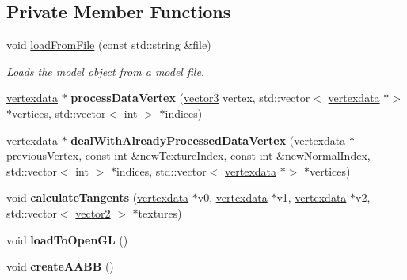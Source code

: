 \subsection*{Private Member Functions}
\begin{DoxyCompactItemize}
\item 
void \hyperlink{classflounder_1_1model_a34c636bee22fcf36fa2a2fcfe0bdadb3}{load\+From\+File} (const std\+::string \&file)
\begin{DoxyCompactList}\small\item\em Loads the model object from a model file. \end{DoxyCompactList}\item 
\mbox{\label{classflounder_1_1model_a24e81bf6b3ec2c428975e6419ebf18ca}} 
\hyperlink{classflounder_1_1vertexdata}{vertexdata} $\ast$ {\bfseries process\+Data\+Vertex} (\hyperlink{classflounder_1_1vector3}{vector3} vertex, std\+::vector$<$ \hyperlink{classflounder_1_1vertexdata}{vertexdata} $\ast$$>$ $\ast$vertices, std\+::vector$<$ int $>$ $\ast$indices)
\item 
\mbox{\label{classflounder_1_1model_a2a5bafcc900a83c0add5b20d3f6ee0c0}} 
\hyperlink{classflounder_1_1vertexdata}{vertexdata} $\ast$ {\bfseries deal\+With\+Already\+Processed\+Data\+Vertex} (\hyperlink{classflounder_1_1vertexdata}{vertexdata} $\ast$previous\+Vertex, const int \&new\+Texture\+Index, const int \&new\+Normal\+Index, std\+::vector$<$ int $>$ $\ast$indices, std\+::vector$<$ \hyperlink{classflounder_1_1vertexdata}{vertexdata} $\ast$$>$ $\ast$vertices)
\item 
\mbox{\label{classflounder_1_1model_ad8eafa9f1c1afde95f7b4035a7e83f59}} 
void {\bfseries calculate\+Tangents} (\hyperlink{classflounder_1_1vertexdata}{vertexdata} $\ast$v0, \hyperlink{classflounder_1_1vertexdata}{vertexdata} $\ast$v1, \hyperlink{classflounder_1_1vertexdata}{vertexdata} $\ast$v2, std\+::vector$<$ \hyperlink{classflounder_1_1vector2}{vector2} $>$ $\ast$textures)
\item 
\mbox{\label{classflounder_1_1model_acf5f1c0df19c406ff98214b376e0d997}} 
void {\bfseries load\+To\+Open\+GL} ()
\item 
\mbox{\label{classflounder_1_1model_adc9de7f0f5a067bd1d1a775986bd3578}} 
void {\bfseries create\+A\+A\+BB} ()
\end{DoxyCompactItemize}


